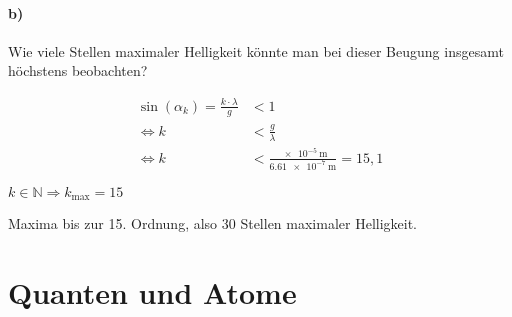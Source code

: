 \documentclass{ajc}
\begin{document}
	\paragraph{b)} Wie viele Stellen maximaler Helligkeit könnte man bei dieser Beugung insgesamt höchstens beobachten?
	
	\begin{equation}
		\begin{split}
			\sin\left(\alpha_k\right)=\frac{k \cdot \lambda}{g} &< 1 \\
			\Leftrightarrow k &< \frac{g}{\lambda} \\
			\Leftrightarrow k &< \frac{\SI{e-5}{\meter}}{\SI{6,61e-7}{\meter}} = 15,1
		\end{split}
	\end{equation}
	
	$k \in \mathbb{N} \Rightarrow k_{\text{max}} = 15$
	
	Maxima bis zur 15. Ordnung, also 30 Stellen maximaler Helligkeit.
	
	\section{Quanten und Atome}
\end{document}
